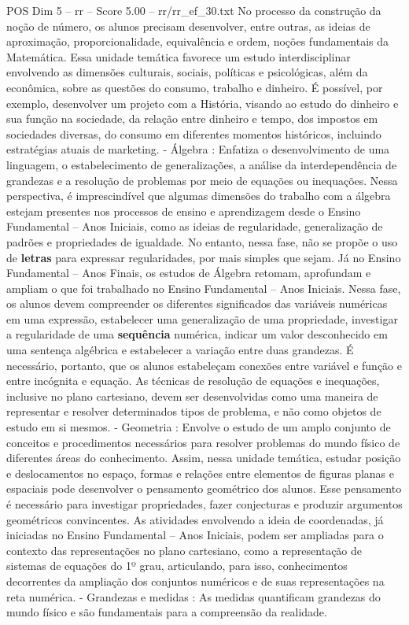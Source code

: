 \begin{textsample}{POS Dim 5 – rr – Score 5.00 – rr/rr\_ef\_30.txt}
No processo da construção da noção de número, os alunos precisam desenvolver, entre outras, as ideias de aproximação, proporcionalidade, equivalência e ordem, noções fundamentais da Matemática.
Essa unidade temática favorece um estudo interdisciplinar envolvendo as dimensões culturais, sociais, políticas e psicológicas, além da econômica, sobre as questões do consumo, trabalho e dinheiro.
É possível, por exemplo, desenvolver um projeto com a História, visando ao estudo do dinheiro e sua função na sociedade, da relação entre dinheiro e tempo, dos impostos em sociedades diversas, do consumo em diferentes momentos históricos, incluindo estratégias atuais de marketing. - Álgebra : Enfatiza o desenvolvimento de uma linguagem, o estabelecimento de generalizações, a análise da interdependência de grandezas e a resolução de problemas por meio de equações ou inequações.
Nessa perspectiva, é imprescindível que algumas dimensões do trabalho com a álgebra estejam presentes nos processos de ensino e aprendizagem desde o Ensino Fundamental – Anos Iniciais, como as ideias de regularidade, generalização de padrões e propriedades de igualdade.
No entanto, nessa fase, não se propõe o uso de \textbf{letras} para expressar regularidades, por mais simples que sejam.
Já no Ensino Fundamental – Anos Finais, os estudos de Álgebra retomam, aprofundam e ampliam o que foi trabalhado no Ensino Fundamental – Anos Iniciais.
Nessa fase, os alunos devem compreender os diferentes significados das variáveis numéricas em uma expressão, estabelecer uma generalização de uma propriedade, investigar a regularidade de uma \textbf{sequência} numérica, indicar um valor desconhecido em uma sentença algébrica e estabelecer a variação entre duas grandezas.
É necessário, portanto, que os alunos estabeleçam conexões entre variável e função e entre incógnita e equação.
As técnicas de resolução de equações e inequações, inclusive no plano cartesiano, devem ser desenvolvidas como uma maneira de representar e resolver determinados tipos de problema, e não como objetos de estudo em si mesmos. - Geometria : Envolve o estudo de um amplo conjunto de conceitos e procedimentos necessários para resolver problemas do mundo físico de diferentes áreas do conhecimento.
Assim, nessa unidade temática, estudar posição e deslocamentos no espaço, formas e relações entre elementos de figuras planas e espaciais pode desenvolver o pensamento geométrico dos alunos.
Esse pensamento é necessário para investigar propriedades, fazer conjecturas e produzir argumentos geométricos convincentes.
As atividades envolvendo a ideia de coordenadas, já iniciadas no Ensino Fundamental – Anos Iniciais, podem ser ampliadas para o contexto das representações no plano cartesiano, como a representação de sistemas de equações do 1º grau, articulando, para isso, conhecimentos decorrentes da ampliação dos conjuntos numéricos e de suas representações na reta numérica. - Grandezas e medidas : As medidas quantificam grandezas do mundo físico e são fundamentais para a compreensão da realidade.

\end{textsample}
